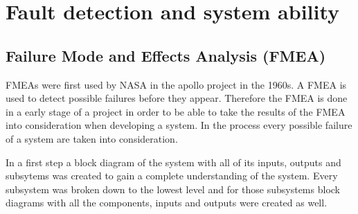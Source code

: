 \documentclass[ExampleMasters.tex]{subfiles}
\begin{document}
\clearpage


\chapter{Fault detection and system ability}
\label{chap:fault_detection}
\section{Failure Mode and Effects Analysis (FMEA)}
\label{sec:FMEA}
FMEAs were first used by NASA in the apollo project in the 1960s.
A FMEA is used to detect possible failures before they appear. Therefore the FMEA is done in a early stage of a project in order to be able to take the results of the FMEA into consideration when developing a system. In the process every possible failure of a system are taken into consideration. 

In a first step a block diagram of the system with all of its inputs, outputs and subsytems was created to gain a complete understanding of the system. Every subsystem was broken down to the lowest level and for those subsystems block diagrams with all the components, inputs and outputs were created as well.
\end{document}
